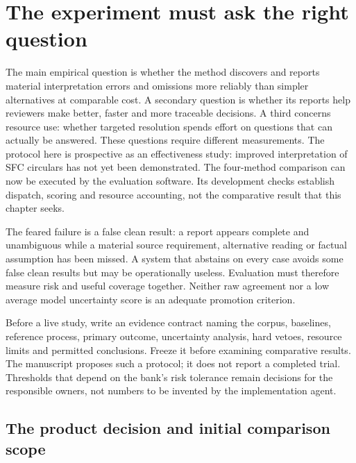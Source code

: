 \section{The experiment must ask the right question}
\label{merge:M09:00}


The main empirical question is whether the method discovers and reports material
interpretation errors and omissions more reliably than simpler alternatives at
comparable cost. A secondary question is whether its reports help reviewers make
better, faster and more traceable decisions. A third concerns resource use:
whether targeted resolution spends effort on questions that can actually be
answered. These questions require different measurements. The protocol here is
prospective as an effectiveness study: improved interpretation of SFC circulars
has not yet been demonstrated. The four-method comparison can now be executed
by the evaluation software. Its development checks establish dispatch, scoring
and resource accounting, not the comparative result that this chapter seeks.


The feared failure is a false clean result: a report appears complete and
unambiguous while a material source requirement, alternative reading or factual
assumption has been missed. A system that abstains on every case avoids some false
clean results but may be operationally useless. Evaluation must therefore measure
risk and useful coverage together. Neither raw agreement nor a low average model
uncertainty score is an adequate promotion criterion.

Before a live study, write an evidence contract naming the corpus, baselines,
reference process, primary outcome, uncertainty analysis, hard vetoes, resource
limits and permitted conclusions. Freeze it before examining comparative results.
The manuscript proposes such a protocol; it does not report a completed trial.
Thresholds that depend on the bank's risk tolerance remain decisions for the
responsible owners, not numbers to be invented by the implementation agent.

\subsection{The product decision and initial comparison scope}
\label{merge:P-04-prototype:00}

